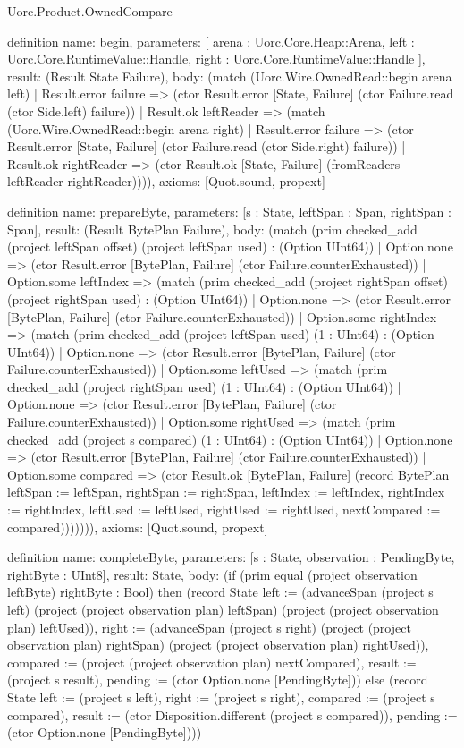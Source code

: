 \begin{lexlean}{Uorc.Product.OwnedCompare}
\begin{semanticmodule}
definition{
  name: begin,
  parameters: [
    arena : Uorc.Core.Heap::Arena,
    left : Uorc.Core.RuntimeValue::Handle,
    right : Uorc.Core.RuntimeValue::Handle
  ],
  result: (Result State Failure),
  body: (match (Uorc.Wire.OwnedRead::begin arena left)
    | Result.error failure => (ctor Result.error [State, Failure] (ctor Failure.read (ctor Side.left) failure))
    | Result.ok leftReader => (match (Uorc.Wire.OwnedRead::begin arena right)
      | Result.error failure => (ctor Result.error [State, Failure] (ctor Failure.read (ctor Side.right) failure))
      | Result.ok rightReader => (ctor Result.ok [State, Failure] (fromReaders leftReader rightReader)))),
  axioms: [Quot.sound, propext]
}

definition{
  name: prepareByte,
  parameters: [s : State, leftSpan : Span, rightSpan : Span],
  result: (Result BytePlan Failure),
  body: (match (prim checked_add (project leftSpan offset) (project leftSpan used) : (Option UInt64))
    | Option.none => (ctor Result.error [BytePlan, Failure] (ctor Failure.counterExhausted))
    | Option.some leftIndex => (match (prim checked_add (project rightSpan offset) (project rightSpan used) : (Option UInt64))
      | Option.none => (ctor Result.error [BytePlan, Failure] (ctor Failure.counterExhausted))
      | Option.some rightIndex => (match (prim checked_add (project leftSpan used) (1 : UInt64) : (Option UInt64))
        | Option.none => (ctor Result.error [BytePlan, Failure] (ctor Failure.counterExhausted))
        | Option.some leftUsed => (match (prim checked_add (project rightSpan used) (1 : UInt64) : (Option UInt64))
          | Option.none => (ctor Result.error [BytePlan, Failure] (ctor Failure.counterExhausted))
          | Option.some rightUsed => (match (prim checked_add (project s compared) (1 : UInt64) : (Option UInt64))
            | Option.none => (ctor Result.error [BytePlan, Failure] (ctor Failure.counterExhausted))
            | Option.some compared => (ctor Result.ok [BytePlan, Failure] (record BytePlan {leftSpan := leftSpan, rightSpan := rightSpan, leftIndex := leftIndex, rightIndex := rightIndex, leftUsed := leftUsed, rightUsed := rightUsed, nextCompared := compared}))))))),
  axioms: [Quot.sound, propext]
}

definition{
  name: completeByte,
  parameters: [s : State, observation : PendingByte, rightByte : UInt8],
  result: State,
  body: (if (prim equal (project observation leftByte) rightByte : Bool) then (record State {left := (advanceSpan (project s left) (project (project observation plan) leftSpan) (project (project observation plan) leftUsed)), right := (advanceSpan (project s right) (project (project observation plan) rightSpan) (project (project observation plan) rightUsed)), compared := (project (project observation plan) nextCompared), result := (project s result), pending := (ctor Option.none [PendingByte])}) else (record State {left := (project s left), right := (project s right), compared := (project s compared), result := (ctor Disposition.different (project s compared)), pending := (ctor Option.none [PendingByte])}))
}


\end{semanticmodule}
\end{lexlean}
